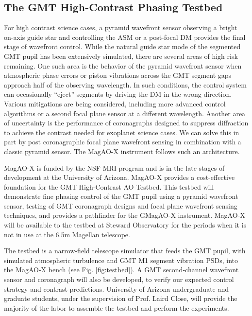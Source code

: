 \documentclass[12pt,preprint]{aastex}
\begin{document}
\subsection{The GMT High-Contrast Phasing Testbed}
\label{subsection:testbed}
For high contrast science cases, a pyramid wavefront sensor observing a bright on-axis guide star and controlling the ASM or a post-focal DM provides the final stage of wavefront control. While the natural guide star mode of the segmented GMT pupil has been extensively simulated, there are several areas of high risk remaining. One such area is the behavior of the pyramid wavefront sensor when atmospheric phase errors or piston vibrations across the GMT segment gaps approach half of the observing wavelength. In such conditions, the control system can occasionally “eject” segments by driving the DM in the wrong direction. Various mitigations are being considered, including more advanced control algorithms or a second focal plane sensor at a different wavelength. Another area of uncertainty is the performance of coronagraphs designed to suppress diffraction to achieve the contrast needed for exoplanet science cases. We can solve this in part by post coronagraphic focal plane wavefront sensing in combination with a classic pyramid sensor. The MagAO-X instrument follows such an architecture. 

MagAO-X is funded by the NSF MRI program and is in the late stages of development at the University of Arizona. MagAO-X provides a cost-effective foundation for the GMT High-Contrast AO Testbed. This testbed will demonstrate fine phasing control of the GMT pupil using a pyramid wavefront sensor, testing of GMT coronagraph designs and focal plane wavefront sensing techniques, and provides a pathfinder for the GMagAO-X instrument. MagAO-X will be available to the testbed at Steward Observatory for the periods when it is not in use at the 6.5m Magellan telescope. 

The testbed is a narrow-field telescope simulator that feeds the GMT pupil, with simulated atmospheric turbulence and GMT M1 segment vibration PSDs, into the MagAO-X bench (see Fig. \ref{fig:testbed}). A GMT second-channel wavefront sensor and coronagraph will also be developed, to verify our expected control strategy and contrast predictions. University of Arizona undergraduate and graduate students, under the supervision of Prof. Laird Close, will provide the majority of the labor to assemble the testbed and perform the experiments.
 
\end{document}
